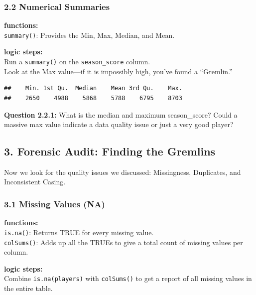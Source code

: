 \documentclass[
]{article}
\newenvironment{Shaded}{\begin{snugshade}}{\end{snugshade}}
\newcommand{\FunctionTok}[1]{\textcolor[rgb]{0.13,0.29,0.53}{\textbf{#1}}}
\newcommand{\NormalTok}[1]{#1}
\newcommand{\SpecialCharTok}[1]{\textcolor[rgb]{0.81,0.36,0.00}{\textbf{#1}}}
\begin{document}
\subsubsection{2.2 Numerical Summaries}\label{numerical-summaries}

\textbf{functions:}\\
\texttt{summary()}: Provides the Min, Max, Median, and Mean.

\textbf{logic steps:}\\
Run a \texttt{summary()} on the \texttt{season\_score} column.\\
Look at the Max value---if it is impossibly high, you've found a
``Gremlin.''

\begin{Shaded}
\end{Shaded}

\begin{verbatim}
##    Min. 1st Qu.  Median    Mean 3rd Qu.    Max. 
##    2650    4988    5868    5788    6795    8703
\end{verbatim}

\textbf{Question 2.2.1:} What is the median and maximum season\_score?
Could a massive max value indicate a data quality issue or just a very
good player?

\subsection{3. Forensic Audit: Finding the
Gremlins}\label{forensic-audit-finding-the-gremlins}

Now we look for the quality issues we discussed: Missingness,
Duplicates, and Inconsistent Casing.

\subsubsection{3.1 Missing Values (NA)}\label{missing-values-na}

\textbf{functions:}\\
\texttt{is.na()}: Returns TRUE for every missing value.\\
\texttt{colSums()}: Adds up all the TRUEs to give a total count of
missing values per column.

\textbf{logic steps:}\\
Combine \texttt{is.na(players)} with \texttt{colSums()} to get a report
of all missing values in the entire table.
\end{document}
